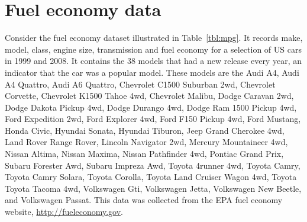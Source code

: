 \section{Fuel economy data}
\label{sec:fuel_economy_data}

Consider the fuel economy dataset illustrated in Table~\ref{tbl:mpg}.  It records make, model, class, engine size, transmission and fuel economy for a selection of US cars in 1999 and 2008.  It contains the 38 models that had a new release every year, an indicator that the car was a popular model.  These models are the Audi A4, Audi A4 Quattro, Audi A6 Quattro, Chevrolet C1500 Suburban 2wd, Chevrolet Corvette, Chevrolet K1500 Tahoe 4wd, Chevrolet Malibu, Dodge Caravan 2wd, Dodge Dakota Pickup 4wd, Dodge Durango 4wd, Dodge Ram 1500 Pickup 4wd, Ford Expedition 2wd, Ford Explorer 4wd, Ford F150 Pickup 4wd, Ford Mustang, Honda Civic, Hyundai Sonata, Hyundai Tiburon, Jeep Grand Cherokee 4wd, Land Rover Range Rover, Lincoln Navigator 2wd, Mercury Mountaineer 4wd, Nissan Altima, Nissan Maxima, Nissan Pathfinder 4wd, Pontiac Grand Prix, Subaru Forester Awd, Subaru Impreza Awd, Toyota 4runner 4wd, Toyota Camry, Toyota Camry Solara, Toyota Corolla, Toyota Land Cruiser Wagon 4wd, Toyota Toyota Tacoma 4wd, Volkswagen Gti, Volkswagen Jetta, Volkswagen New Beetle, and Volkswagen Passat.  This data was collected from the EPA fuel economy website, \url{http://fueleconomy.gov}.

